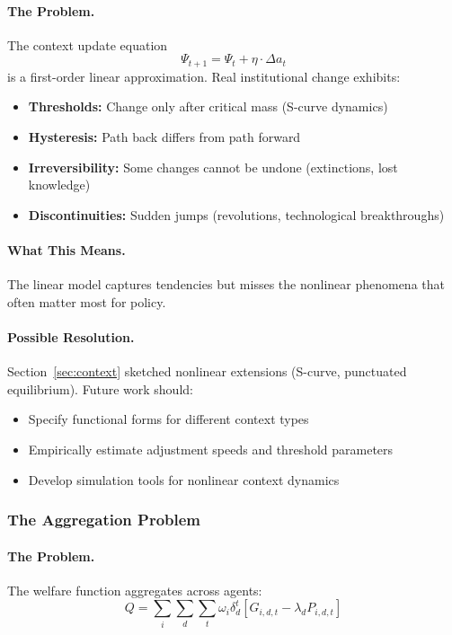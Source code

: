 \documentclass[12pt,a4paper]{article}
\begin{document}
\paragraph{The Problem.}
The context update equation
\begin{equation}
  \Psi_{t+1} = \Psi_t + \eta \cdot \Delta a_t
\end{equation}
is a first-order linear approximation. Real institutional change exhibits:
\begin{itemize}
  \item \textbf{Thresholds:} Change only after critical mass (S-curve dynamics)
  \item \textbf{Hysteresis:} Path back differs from path forward
  \item \textbf{Irreversibility:} Some changes cannot be undone (extinctions, lost knowledge)
  \item \textbf{Discontinuities:} Sudden jumps (revolutions, technological breakthroughs)
\end{itemize}

\paragraph{What This Means.}
The linear model captures tendencies but misses the nonlinear phenomena
that often matter most for policy.

\paragraph{Possible Resolution.}
Section~\ref{sec:context} sketched nonlinear extensions (S-curve, punctuated equilibrium).
Future work should:
\begin{itemize}
  \item Specify functional forms for different context types
  \item Empirically estimate adjustment speeds and threshold parameters
  \item Develop simulation tools for nonlinear context dynamics
\end{itemize}

\subsubsection{The Aggregation Problem}

\paragraph{The Problem.}
The welfare function aggregates across agents:
\begin{equation}
  Q = \sum_i \sum_d \sum_t \omega_i \delta_d^t [G_{i,d,t} - \lambda_d P_{i,d,t}]
\end{equation}
\end{document}
